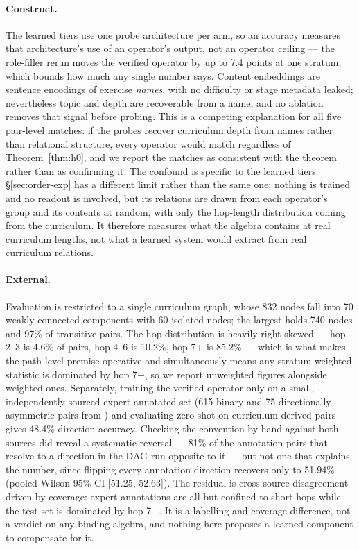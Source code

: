 \documentclass[10pt]{article}
\begin{document}
\paragraph{Construct.} The learned tiers use one probe architecture per arm, so an accuracy measures that architecture's use of an operator's output, not an operator ceiling --- the role-filler rerun moves the verified operator by up to 7.4 points at one stratum, which bounds how much any single number says. Content embeddings are sentence encodings of exercise \emph{names}, with no difficulty or stage metadata leaked; nevertheless topic and depth are recoverable from a name, and no ablation removes that signal before probing. This is a competing explanation for all five pair-level matches: if the probes recover curriculum depth from names rather than relational structure, every operator would match regardless of Theorem~\ref{thm:h0}, and we report the matches as consistent with the theorem rather than as confirming it. The confound is specific to the learned tiers. \S\ref{sec:order-exp} has a different limit rather than the same one: nothing is trained and no readout is involved, but its relations are drawn from each operator's group and its contents at random, with only the hop-length distribution coming from the curriculum. It therefore measures what the algebra contains at real curriculum lengths, not what a learned system would extract from real curriculum relations.

\paragraph{External.} Evaluation is restricted to a single curriculum graph, whose 832 nodes fall into 70 weakly connected components with 60 isolated nodes; the largest holds 740 nodes and 97\% of transitive pairs. The hop distribution is heavily right-skewed --- hop 2--3 is 4.6\% of pairs, hop 4--6 is 10.2\%, hop 7+ is 85.2\% --- which is what makes the path-level premise operative and simultaneously means any stratum-weighted statistic is dominated by hop 7+, so we report unweighted figures alongside weighted ones. Separately, training the verified operator only on a small, independently sourced expert-annotated set (615 binary and 75 directionally-asymmetric pairs from \citet{chang2015modeling}) and evaluating zero-shot on curriculum-derived pairs gives 48.4\% direction accuracy. Checking the convention by hand against both sources did reveal a systematic reversal --- 81\% of the annotation pairs that resolve to a direction in the DAG run opposite to it --- but not one that explains the number, since flipping every annotation direction recovers only to 51.94\% (pooled Wilson 95\% CI [51.25, 52.63]). The residual is cross-source disagreement driven by coverage: expert annotations are all but confined to short hops while the test set is dominated by hop 7+. It is a labelling and coverage difference, not a verdict on any binding algebra, and nothing here proposes a learned component to compensate for it.
\end{document}
